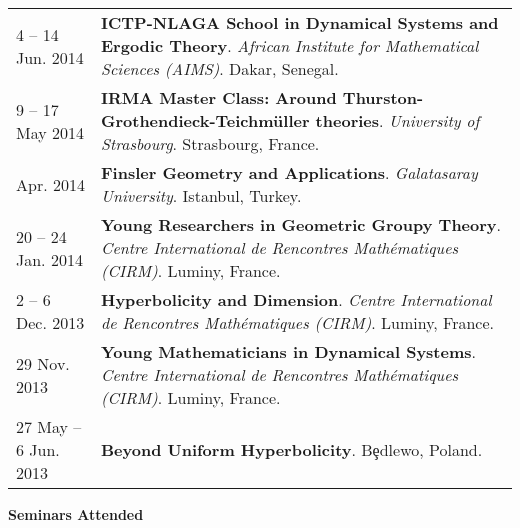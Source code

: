 \begin{center}
{\begin{longtable}{p{}  p{}}
4  -- 14 Jun.  2014 & \textbf{ICTP-NLAGA School in Dynamical Systems and Ergodic Theory}. \textit{African Institute for Mathematical Sciences (AIMS)}.  Dakar, Senegal.  \\ 
9  -- 17 May  2014 & \textbf{IRMA Master Class: Around Thurston-Grothendieck-Teichm\"uller theories}. \textit{University of Strasbourg}.  Strasbourg, France.  \\ 
 Apr.  2014 & \textbf{Finsler Geometry and Applications}. \textit{Galatasaray University}.  Istanbul, Turkey.  \\ 
20  -- 24 Jan.  2014 & \textbf{Young Researchers in Geometric Groupy Theory}. \textit{Centre International de Rencontres Math\'ematiques (CIRM)}.  Luminy, France.  \\ 
2  -- 6 Dec.  2013 & \textbf{Hyperbolicity and Dimension}. \textit{Centre International de Rencontres Math\'ematiques (CIRM)}.  Luminy, France.  \\ 
29 Nov.  2013 & \textbf{Young Mathematicians in Dynamical Systems}. \textit{Centre International de Rencontres Math\'ematiques (CIRM)}.  Luminy, France.  \\ 
27 May  -- 6 Jun.  2013 & \textbf{Beyond Uniform Hyperbolicity}.  B\c{e}dlewo, Poland.  
    \end{longtable}
    } 
    \end{center}

    \vspace{-1em}
    

    \textbf{\large Seminars Attended}
    
